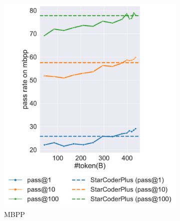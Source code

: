 \begin{figure}[t]
\begin{subfigure}{0.3\textwidth}
        \includegraphics[width=\textwidth]{fig/mbpp-aurora-m.pdf}
        \vspace{0.42em}
        \caption{MBPP}
        \label{fig:trend-mbpp}
    \end{subfigure}
    \hfill
    \begin{subfigure}{0.33\textwidth}
        \centering

\end{subfigure}
\end{figure}
